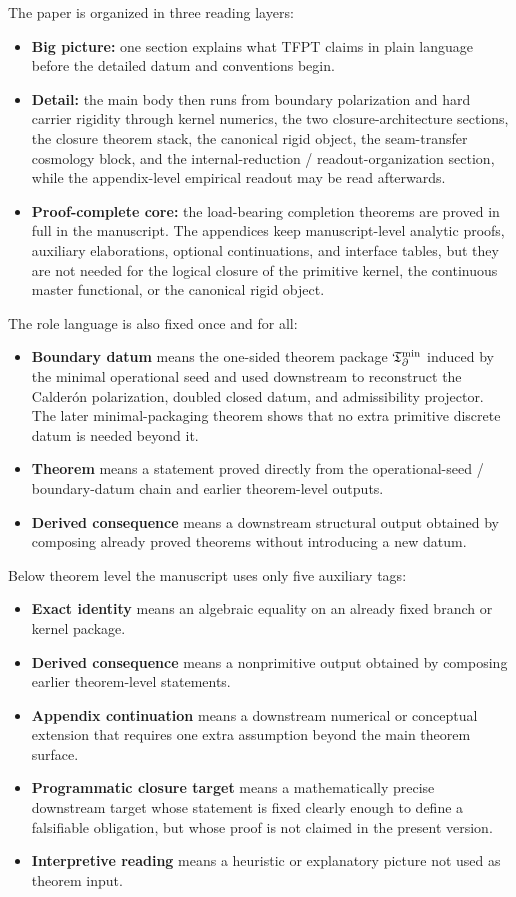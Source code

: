 The paper is organized in three reading layers:
\begin{itemize}[leftmargin=1.5em, topsep=3pt, itemsep=2pt]
    \item \textbf{Big picture:} one section explains what TFPT claims in plain language before the detailed datum and conventions begin.
    \item \textbf{Detail:} the main body then runs from boundary polarization and hard carrier rigidity through kernel numerics, the two closure-architecture sections, the closure theorem stack, the canonical rigid object, the seam-transfer cosmology block, and the internal-reduction / readout-organization section, while the appendix-level empirical readout may be read afterwards.
    \item \textbf{Proof-complete core:} the load-bearing completion theorems are proved in full in the manuscript.
    The appendices keep manuscript-level analytic proofs, auxiliary elaborations, optional
    continuations, and interface tables, but they are not needed for the logical closure of the
    primitive kernel, the continuous master functional, or the canonical rigid object.
\end{itemize}
The role language is also fixed once and for all:
\begin{itemize}[leftmargin=1.5em, topsep=3pt, itemsep=2pt]
    \item \textbf{Boundary datum} means the one-sided theorem package $\mathfrak T_{\partial}^{\min}$ induced by the minimal operational seed and used downstream to reconstruct the Calder\'on polarization, doubled closed datum, and admissibility projector. The later minimal-packaging theorem shows that no extra primitive discrete datum is needed beyond it.
    \item \textbf{Theorem} means a statement proved directly from the operational-seed / boundary-datum chain and earlier theorem-level outputs.
    \item \textbf{Derived consequence} means a downstream structural output obtained by composing already proved theorems without introducing a new datum.
\end{itemize}
Below theorem level the manuscript uses only five auxiliary tags:
\begin{itemize}[leftmargin=1.5em, topsep=3pt, itemsep=2pt]
    \item \textbf{Exact identity} means an algebraic equality on an already fixed branch or kernel package.
    \item \textbf{Derived consequence} means a nonprimitive output obtained by composing earlier theorem-level statements.
    \item \textbf{Appendix continuation} means a downstream numerical or conceptual extension that requires one extra assumption beyond the main theorem surface.
    \item \textbf{Programmatic closure target} means a mathematically precise downstream target whose statement is fixed clearly enough to define a falsifiable obligation, but whose proof is not claimed in the present version.
    \item \textbf{Interpretive reading} means a heuristic or explanatory picture not used as theorem input.
\end{itemize}

